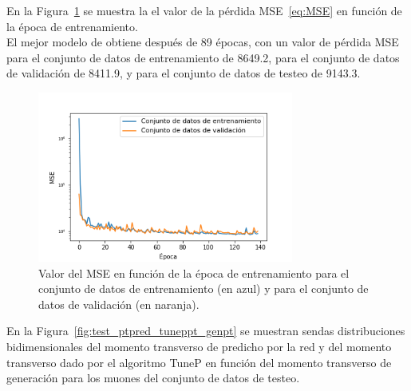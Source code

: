 En la Figura~\ref{fig:model_loss} se muestra la el valor de la p\'erdida MSE~\eqref{eq:MSE} en funci\'on de la \'epoca de entrenamiento. \\

El mejor modelo de obtiene despu\'es de 89 \'epocas, con un valor de p\'erdida MSE para el conjunto de datos de entrenamiento de 8649.2, para el conjunto de datos de validaci\'on de 8411.9, y para el conjunto de datos de testeo de 9143.3. 

\begin{figure}[h]
\centering
\includegraphics[width=0.75\textwidth]{figures/model_loss.png}
\caption{Valor del MSE en funci\'on de la \'epoca de entrenamiento para el conjunto de datos de entrenamiento (en azul) y para el conjunto de datos de validaci\'on (en naranja).}
\label{fig:model_loss}        
\end{figure}

En la Figura~\ref{fig:test_ptpred_tuneppt_genpt} se muestran sendas distribuciones bidimensionales del momento transverso de predicho por la red y del momento transverso dado por el algoritmo TuneP en funci\'on del momento transverso de generaci\'on para los muones del conjunto de datos de testeo. \\


